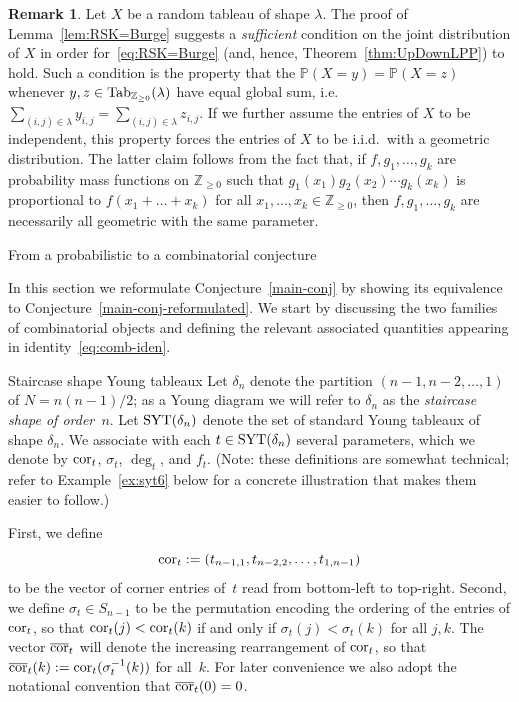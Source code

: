 \documentclass[a4paper,reqno,12pt]{amsart}
\makeatletter
\theoremstyle{plain}
\theoremstyle{definition}
\newtheorem{rem}[thm]{Remark}
\renewcommand\section{\@startsection{section}{1}%
\z@{.7\linespacing\@plus\linespacing}{.5\linespacing}%
{\large\bfseries\scshape\centering}}
\renewcommand\subsection{\@startsection{subsection}{2}%
  \z@{.5\linespacing\@plus.7\linespacing}{-.5em}%
  {\bfseries\scshape}}
\newcommand{\firstmention}{\emph}
\newcommand{\Z}{\mathbb{Z}}
\newcommand{\sym}{S}
\newcommand{\syt}{\textnormal{SYT}}
\newcommand{\staircase}{\delta}
\newcommand{\diag}{\textnormal{cor}}
\newcommand{\diagsorted}{\overline{\diag}}
\newcommand{\tab}{\textnormal{Tab}}
\renewcommand{\P}{\mathbb{P}}
\newcommand{\1}{\mathbbm{1}}
\makeatother
\begin{document}
\begin{rem}
Let $X$ be a random tableau of shape $\lambda$.
The proof of Lemma~\ref{lem:RSK=Burge} suggests a \emph{sufficient} condition on the joint distribution of $X$ in order for~\eqref{eq:RSK=Burge} (and, hence, Theorem~\ref{thm:UpDownLPP}) to hold.
Such a condition is the property that the $\P(X=y) = \P(X=z)$ whenever $y,z\in \tab_{\Z_{\geq 0}}(\lambda)$ have equal global sum, i.e.\ $\sum_{(i,j)\in\lambda} y_{i,j} = \sum_{(i,j)\in\lambda} z_{i,j}$.
If we further assume the entries of $X$ to be independent, this property forces the entries of $X$ to be i.i.d.\ with a geometric distribution.
The latter claim follows from the fact that, if $f,g_1,\dots,g_k$ are probability mass functions on $\Z_{\geq 0}$ such that $g_1(x_1)g_2(x_2) \cdots g_k(x_k)$ is proportional to $f(x_1+\dots +x_k)$ for all $x_1,\dots,x_k\in \Z_{\geq 0}$, then $f,g_1,\dots,g_k$ are necessarily all geometric with the same parameter.
\end{rem}



\section{From a probabilistic to a combinatorial conjecture}
\label{sec:comb-iden}

In this section we reformulate Conjecture~\ref{main-conj} by showing its equivalence to Conjecture~\ref{main-conj-reformulated}.
We start by discussing the two families of combinatorial objects and defining the relevant associated quantities appearing in identity~\eqref{eq:comb-iden}.


\subsection{Staircase shape Young tableaux}
\label{subsec:staircaseTableaux}
Let $\staircase_n$ denote the partition $(n-1,n-2,\ldots,1)$ of $N=n(n-1)/2$; as a Young diagram we will refer to $\staircase_n$ as the \firstmention{staircase shape of order~$n$}.
Let $\syt(\staircase_n)$ denote the set of standard Young tableaux of shape $\staircase_n$.
We associate with each $t\in\syt(\staircase_n)$ several parameters, which we denote by $\diag_t$, $\sigma_t$, $\deg_t$, and $f_t$.
(Note: these definitions are somewhat technical; refer to Example~\ref{ex:syt6} below for a concrete illustration that makes them easier to follow.)

First, we define
\[
\diag_t := (t_{n-1,1}, t_{n-2,2}, \ldots, t_{1,n-1})
\]
to be the vector of corner entries of~$t$ read from bottom-left to top-right. 
Second, we define $\sigma_t\in \sym_{n-1}$ to be the permutation  encoding the ordering of the entries of $\diag_t$, so that $\diag_t(j) < \diag_t(k)$ if and only if $\sigma_t(j) < \sigma_t(k)$ for all $j,k$.
The vector $\diagsorted_t$ will denote the increasing rearrangement of $\diag_t$, so that $\diagsorted_t(k):=\diag_t(\sigma_t^{-1}(k))$ for all~$k$.
For later convenience we also adopt the notational convention that  $\diagsorted_t(0)=0$.
\end{document}
